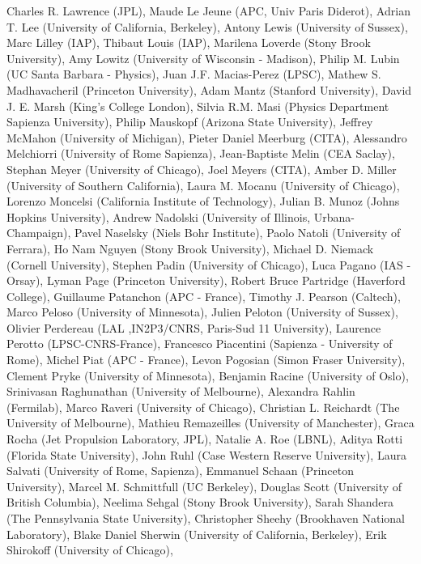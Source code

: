 Charles R. Lawrence (JPL),
Maude Le Jeune (APC, Univ Paris Diderot),
Adrian T. Lee (University of California, Berkeley),
Antony Lewis (University of Sussex),
Marc Lilley (IAP),
Thibaut Louis (IAP),
Marilena Loverde (Stony Brook University),
Amy Lowitz (University of Wisconsin - Madison),
Philip M. Lubin (UC Santa Barbara - Physics),
Juan J.F. Macias-Perez (LPSC),
Mathew S. Madhavacheril (Princeton University),
Adam Mantz (Stanford University),
David J. E. Marsh (King's College London),
Silvia R.M. Masi (Physics Department Sapienza University),
Philip Mauskopf (Arizona State University),
Jeffrey McMahon (University of Michigan),
Pieter Daniel Meerburg (CITA),
Alessandro Melchiorri (University of Rome Sapienza),
Jean-Baptiste Melin (CEA Saclay),
Stephan Meyer (University of Chicago),
Joel Meyers (CITA),
Amber D. Miller (University of Southern California),
Laura M. Mocanu (University of Chicago),
Lorenzo Moncelsi (California Institute of Technology),
Julian B. Munoz (Johns Hopkins University),
Andrew Nadolski (University of Illinois, Urbana-Champaign),
Pavel Naselsky (Niels Bohr Institute),
Paolo Natoli (University of Ferrara),
Ho Nam Nguyen (Stony Brook University),
Michael D. Niemack (Cornell University),
Stephen Padin (University of Chicago),
Luca Pagano (IAS - Orsay),
Lyman Page (Princeton University),
Robert Bruce Partridge (Haverford College),
Guillaume Patanchon (APC - France),
Timothy J. Pearson (Caltech),
Marco Peloso (University of Minnesota),
Julien Peloton (University of Sussex),
Olivier Perdereau (LAL ,IN2P3/CNRS,  Paris-Sud 11 University),
Laurence Perotto (LPSC-CNRS-France),
Francesco Piacentini (Sapienza - University of Rome),
Michel Piat (APC - France),
Levon Pogosian (Simon Fraser University),
Clement Pryke (University of Minnesota),
Benjamin Racine (University of Oslo),
Srinivasan Raghunathan (University of Melbourne),
Alexandra Rahlin (Fermilab),
Marco Raveri (University of Chicago),
Christian L. Reichardt (The University of Melbourne),
Mathieu Remazeilles (University of Manchester),
Graca Rocha (Jet Propulsion Laboratory, JPL),
Natalie A. Roe (LBNL),
Aditya Rotti (Florida State University),
John Ruhl (Case Western Reserve University),
Laura Salvati (University of Rome, Sapienza),
Emmanuel Schaan (Princeton University),
Marcel M. Schmittfull (UC Berkeley),
Douglas Scott (University of British Columbia),
Neelima Sehgal (Stony Brook University),
Sarah Shandera (The Pennsylvania State University),
Christopher Sheehy (Brookhaven National Laboratory),
Blake Daniel Sherwin (University of California, Berkeley),
Erik Shirokoff (University of Chicago),
